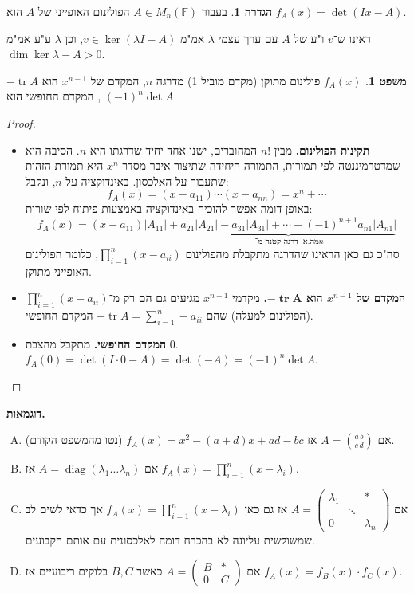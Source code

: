 \documentclass[a4paper]{article}
\DeclareMathOperator{\diag}    {diag}
\DeclareMathOperator{\tr}      {tr}
\newcommand\F         {\mathbb{F}}
\newcommand\pms[1]    {\begin{pmatrix}
		#1
\end{pmatrix}}
\renewcommand\lg      {\lambda}
\theoremstyle{definition}
\newtheorem{Theorem}{משפט}
\newtheorem{definition}{הגדרה}
\newcommand\theo  [1] {\begin{Theorem}#1\end{Theorem}}
\newcommand\defi  [1] {\begin{definition}#1\end{definition}}
\begin{document}
	\defi{בעבור $A \in M_n(\F)$ הפולינום האופייני של $A$ הוא $f_A(x) = \det(Ix - A)$. }
	
	ראינו ש־$v$ ו"ע של $A$ עם ערך עצמי $\lg$ אמ"מ $v \in \ker(\lg I - A)$, וכן $\lg$ ע"ע אמ"מ $\dim \ker \lg - A > 0$. 
	
	\theo{$f_A(x)$ פולינום מתוקן (מקדם מוביל 1) מדרגה $n$, המקדם של $x^{n - 1}$ הוא $-\tr A$, המקדם החופשי הוא $(-1)^{n}\det A$. }
	
	\begin{proof}\,
		\begin{itemize}
			\item\textbf{ תקינות הפולינום. }מבין $n!$ המחוברים, ישנו אחד יחיד שדרגתו היא $n$. הסיבה היא שמדטרמיננטה לפי תמורות, התמורה היחידה שתיצור איבר מסדר $x^n$ היא תמורת הזהות שתעבור על האלכסון. באינדוקציה על $n$, ונקבל: 
			\[ f_A(x) = (x - a_{11}) \cdots (x - a_{nn}) = x^{n} + \cdots \]
			באופן דומה אפשר להוכיח באינדוקציה באמצעות פיתוח לפי שורות: 
			\[ f_A(x) = (x - a_{11})|A_11| + \underbrace{a_{21}|A_21| - a_{31}|A_31| + \cdots + (-1)^{n + 1}a_{n1}|A_{n1}|}_{\,\!\text{מה.א. דרגה קטנה מ־$n$}} \]
			סה"כ גם כאן הראינו שהדרגה מתקבלת מהפולינום $\prod^{n}_{i = 1}(x - a_{ii})$, כלומר הפולינום האופייני מתוקן. 
			
			\item\textbf{המקדם של $x^{n - 1}$ הוא $\bm{-\tr A}$. } מקדמי $x^{n - 1}$ מגיעים גם הם רק מ־$\prod^{n}_{i = 1}(x - a_{ii})$ (הפולינום למעלה) שהם $-\tr A = \sum_{i = 1}^{n}-a_{ii}$ המקדם החופשי. 
			\item\textbf{המקדם החופשי. }מתקבל מהצבת $0$. $f_A(0) = \det(I \cdot 0 - A) = \det(-A) = (-1)^{n}\det A$. 
		\end{itemize}
	\end{proof}
	
	\textbf{דוגמאות. }\begin{enumerate}[A)]
		\item אם $A = \binom{a \, b}{c \, d}$ אז $f_A(x) = x^{2} - (a + d)x + ad - bc$ (נטו מהמשפט הקודם). 
		\item אם $A = \diag(\lg_1 \dots \lg_n)$ אז $f_A(x) = \prod_{i = 1}^{n}(x - \lg_i)$. 
		\item אם $A = \pms{\lg_1 & & * \\ & \ddots & \\  0 && \lg_n}$ אז גם כאן $f_A(x) = \prod_{i = 1}^{n}(x - \lg_i)$ אך כדאי לשים לב שמשולשית עליונה לא בהכרח דומה לאלכסונית עם אותם הקבועים. 
		\item אם $A = \pms{B & * \\ 0 & C}$ כאשר $B, C$ בלוקים ריבועיים אז $f_A(x) = f_B(x) \cdot f_C(x)$. 
	\end{enumerate}
	
\end{document}
